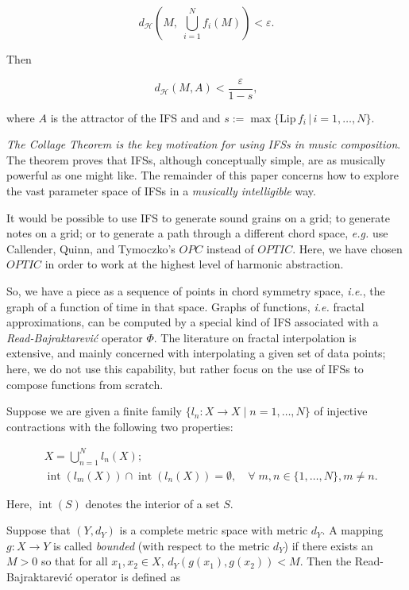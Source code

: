\documentclass[english,11pt,letterpaper,onecolumn]{scrartcl}
\numberwithin{equation}{section}
\newcommand{\st}{\,|\,}
\newcommand{\calH}{\mathcal{H}}
\newcommand{\Int}{\mathop{\mathrm{int}}}
\newcommand{\be}{\begin{equation}}
\newcommand{\ee}{\end{equation}}
\begin{document}
\be\label{hutchop}
d_\calH \left(M, \;\bigcup_{i=1}^N f_i (M) \right) < \varepsilon.
\ee

\noindent Then

\[
d_\calH (M, A) < \frac{\varepsilon}{1-s},
\]

\noindent where $A$ is the attractor of the IFS and  and $s :=
\max\{\mathrm{Lip}\,f_i\st
i = 1, \ldots, N\}$.

\textit{The Collage Theorem is the key motivation for using IFSs in music
composition}. The theorem proves that IFSs, although conceptually simple, are as
musically powerful as one might like. The remainder of this paper concerns how
to explore the vast parameter space of IFSs in a \textit{musically intelligible}
way.

It would be possible to use IFS to generate sound grains on a grid; to generate
notes on a grid; or to generate a path through a different chord space,
\textit{e.g.} use Callender, Quinn, and Tymoczko's $OPC$ instead of $OPTIC$.
Here, we have chosen $OPTIC$ in order to work at the highest level of harmonic
abstraction.

So, we have a piece as a sequence of points in chord symmetry space,
\textit{i.e.}, the graph of a function of time in that space. Graphs of
functions, \textit{i.e.} fractal approximations, can be computed by a special
kind of IFS associated with a \textit{Read-Bajraktarevi\'c} operator $\Phi$. The
literature on fractal interpolation is extensive, and mainly concerned with
interpolating a given set of data points; here, we do not use this capability,
but rather focus on the use of IFSs to compose functions from scratch.

Suppose we are given a finite family $\{l_n : X\to X \mid n = 1, \ldots, N\}$ of
injective contractions with the following two properties:

\begin{align}
&X = \bigcup_{n=1}^N l_n(X);\label{union}\\
&\Int (l_m(X))\cap \Int(l_n(X)) = \emptyset, \quad\forall\;m, n\in \{1,\ldots,
N\}, m\neq n.
\end{align}

\noindent Here, $\Int (S)$ denotes the interior of a set $S$.

Suppose that $(Y,d_Y)$ is a complete metric space with metric $d_Y$. A mapping
$g:X\to Y$ is called \emph{bounded} (with respect to the metric $d_Y$) if
there exists an $M > 0$ so that for all $x_1, x_2\in X$, $d_Y(g(x_1),g(x_2)) <
M$. Then the Read-Bajraktarevi\'c operator is defined as
\end{document}
